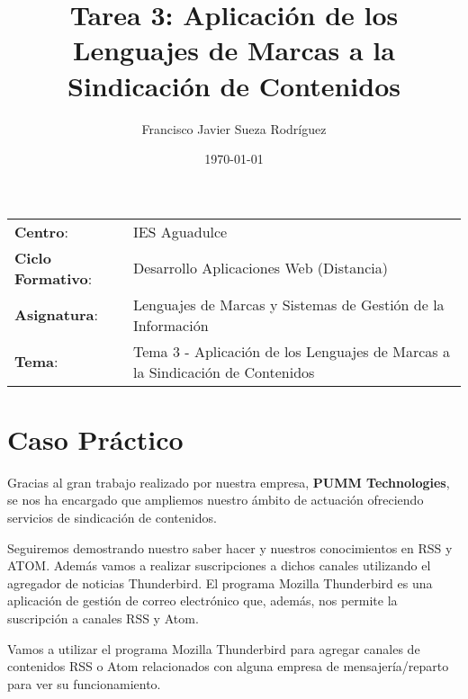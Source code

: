 


\title{
\vspace{10ex}
\normalfont \normalsize
\Huge \textbf{Tarea 3: Aplicación de los Lenguajes de Marcas a la Sindicación de Contenidos}
}
\author{Francisco Javier Sueza Rodríguez}
\date{\normalsize\today}



\maketitle

\thispagestyle{empty}

\vspace{62ex}

\begin{center}
    \begin{tabular}{l l}
        \textbf{Centro}: & IES Aguadulce \\
        \textbf{Ciclo Formativo}: & Desarrollo Aplicaciones Web (Distancia)\\
        \textbf{Asignatura}: & Lenguajes de Marcas y Sistemas de Gestión de la Información\\
        \textbf{Tema}: & Tema 3 -  Aplicación de los Lenguajes de Marcas a la Sindicación de Contenidos\\
    \end{tabular}
\end{center}

\newpage

\tableofcontents

\newpage

\listoffigures

\newpage

\section{Caso Práctico}
Gracias al gran trabajo realizado por nuestra empresa, \textbf{PUMM Technologies}, se nos ha encargado que ampliemos nuestro ámbito de actuación ofreciendo servicios de sindicación de contenidos.

Seguiremos demostrando nuestro saber hacer y nuestros conocimientos en RSS y ATOM. Además vamos a realizar suscripciones a dichos canales utilizando el agregador de noticias Thunderbird. El programa Mozilla Thunderbird es una aplicación de gestión de correo electrónico que, además, nos permite la suscripción a canales RSS y Atom.

Vamos a utilizar el programa Mozilla Thunderbird para agregar canales de contenidos RSS o Atom relacionados con alguna empresa de mensajería/reparto para ver su funcionamiento.

\newpage



